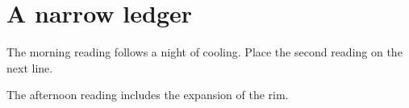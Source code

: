 \documentclass[12pt]{article}
\begin{document}
\section*{A narrow ledger}
The morning reading follows a night of cooling. Place the second reading on the next line.\par The afternoon reading includes the expansion of the rim.
\end{document}
